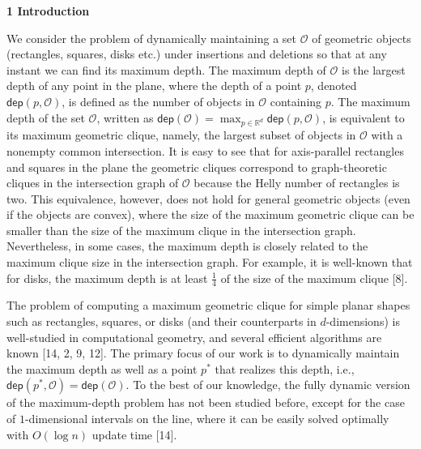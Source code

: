\par\medskip\noindent\textbf{1 Introduction}\par
We consider the problem of dynamically maintaining a set $\mathcal{O}$ of geometric objects (rectangles, squares, disks etc.) under insertions and deletions so that at any instant we can find its maximum depth. The maximum depth of $\mathcal{O}$ is the largest depth of any point in the plane, where the depth of a point $p$, denoted ${\mathsf{dep}}(p,\mathcal{O})$, is defined as the number of objects in $\mathcal{O}$ containing $p$. The maximum depth of the set $\mathcal{O}$, written as ${\mathsf{dep}}(\mathcal{O})=\max_{p\in\mathbb{R}^{d}}{\mathsf{dep}}(p,\mathcal%
{O})$, is equivalent to its maximum geometric clique, namely, the largest subset of objects in $\mathcal{O}$ with a nonempty common intersection. It is easy to see that for axis-parallel rectangles and squares in the plane the geometric cliques correspond to graph-theoretic cliques in the intersection graph of $\mathcal{O}$ because the Helly number of rectangles is two. This equivalence, however, does not hold for general geometric objects (even if the objects are convex), where the size of the maximum geometric clique can be smaller than the size of the maximum clique in the intersection graph. Nevertheless, in some cases, the maximum depth is closely related to the maximum clique size in the intersection graph. For example, it is well-known that for disks, the maximum depth is at least $\frac{1}{4}$ of the size of the maximum clique [8].
\par
\par
The problem of computing a maximum geometric clique for simple planar shapes such as rectangles, squares, or disks (and their counterparts in $d$-dimensions) is well-studied in computational geometry, and several efficient algorithms are known [14, 2, 9, 12]. The primary focus of our work is to dynamically maintain the maximum depth as well as a point $p^{*}$ that realizes this depth, i.e., $\mathsf{dep}(p^{*},\mathcal{O})=\mathsf{dep}(\mathcal{O})$. To the best of our knowledge, the fully dynamic version of the maximum-depth problem has not been studied before, except for the case of $1$-dimensional intervals on the line, where it can be easily solved optimally with $O(\log n)$ update time [14].
\par
\par
